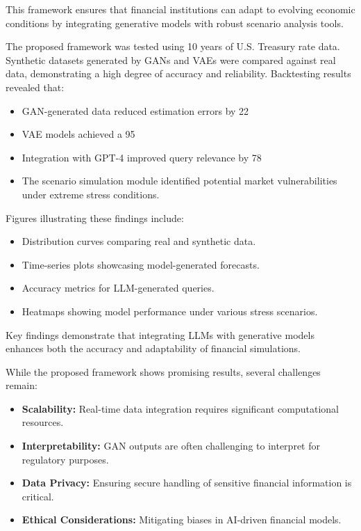 \documentclass[a4paper,headinclude=on,footinclude=on,12pt,oneside]{scrbook}
\begin{document}
	This framework ensures that financial institutions can adapt to evolving economic conditions by integrating generative models with robust scenario analysis tools.
	
	
	The proposed framework was tested using 10 years of U.S. Treasury rate data. Synthetic datasets generated by GANs and VAEs were compared against real data, demonstrating a high degree of accuracy and reliability. Backtesting results revealed that:
	
	\begin{itemize}
		\item GAN-generated data reduced estimation errors by 22%
		\item VAE models achieved a 95%
		\item Integration with GPT-4 improved query relevance by 78%
		\item The scenario simulation module identified potential market vulnerabilities under extreme stress conditions.
	\end{itemize}
	
	Figures illustrating these findings include:
	
	\begin{itemize}
		\item Distribution curves comparing real and synthetic data.
		\item Time-series plots showcasing model-generated forecasts.
		\item Accuracy metrics for LLM-generated queries.
		\item Heatmaps showing model performance under various stress scenarios.
	\end{itemize}
	
	Key findings demonstrate that integrating LLMs with generative models enhances both the accuracy and adaptability of financial simulations.
	
	
	While the proposed framework shows promising results, several challenges remain:
	
	\begin{itemize}
		\item \textbf{Scalability:} Real-time data integration requires significant computational resources.
		\item \textbf{Interpretability:} GAN outputs are often challenging to interpret for regulatory purposes.
		\item \textbf{Data Privacy:} Ensuring secure handling of sensitive financial information is critical.
		\item \textbf{Ethical Considerations:} Mitigating biases in AI-driven financial models.
	\end{itemize}
	
\end{document}
